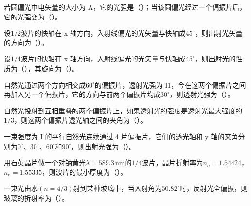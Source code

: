 \documentclass[standard, analysis, notocnum]{ExBook}
\newcommand{\answerarea}[1][8cm]{%
  \par\vspace{2mm}%
  \noindent{\color{themeColor!35}\rule{\linewidth}{0.4pt}}\par
  \noindent\begin{minipage}[t][#1][t]{\linewidth}\vspace{0pt}\end{minipage}\par
  \noindent{\color{themeColor!35}\rule{\linewidth}{0.4pt}}\par
}
\begin{document}
\begin{qitems}
\begin{bbox}
\answerarea[3.5cm]
\end{bbox}
\begin{bbox}
\qitem 若圆偏光中电矢量的大小为 A，它的光强是（\hspace{1.6em}）；当该圆偏光经过一个偏振片后，它的光强变为（\hspace{1.6em}）。
\answerarea[3.5cm]
\end{bbox}
\begin{bbox}
\qitem 设$1/2$波片的快轴在 x 轴方向，入射线偏光的光矢量与快轴成$45^{\circ}$，则出射光矢量的方向为（\hspace{1.6em}）。
\answerarea[3.5cm]
\end{bbox}
\begin{bbox}
\qitem 设$1/4$波片的快轴在 x 轴方向，入射线偏光的光矢量与快轴成$45^{\circ}$，则出射光的性质为（\hspace{1.6em}），其旋向为（\hspace{1.6em}）。
\answerarea[3.5cm]
\end{bbox}
\begin{bbox}
\qitem 自然光通过两个方向相交成$60^{\circ}$的偏振片，透射光强为 I1，今在这两个偏振片之间再加入另一个偏振片，它的方向与前两个偏振片均成$30^{\circ}$，则透射光强为（\hspace{1.6em}）。
\answerarea[3.5cm]
\end{bbox}
\begin{bbox}
\qitem 自然光投射到互相重叠的两个偏振片上，如果透射光的强度是透射光最大强度的$1/3$，则这两个偏振片透光轴之间的夹角为（\hspace{1.6em}）。
\answerarea[3.5cm]
\end{bbox}
\begin{bbox}
\qitem 一束强度为 I 的平行自然光连续通过 4 片偏振片，它们的透光轴和 y 轴的夹角分别为$0^{\circ}$、$30^{\circ}$、$60^{\circ}$和$90^{\circ}$，则出射光强为（\hspace{1.6em}）。
\answerarea[3.5cm]
\end{bbox}
\begin{bbox}
\qitem 用石英晶片做一个对钠黄光$\lambda =589.3\,\mathrm{nm}$的$1/4$波片，晶片折射率为$n_{o}=1.54424$，$n_{e}=1.55335$，则波片的最小厚度为（\hspace{1.6em}）。
\answerarea[3.5cm]
\end{bbox}
\begin{bbox}
\qitem 一束光由水$(n=4/3)$射到某种玻璃中，当入射角为$50.82^{\circ}$时，反射光全偏振，则玻璃的折射率为（\hspace{1.6em}）。
\answerarea[3.5cm]
\end{bbox}

\end{qitems}
\end{document}
